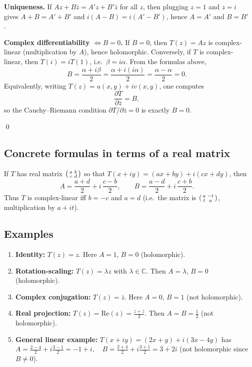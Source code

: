 \documentclass[11pt,a4paper]{article}
\theoremstyle{definition}
\theoremstyle{definition}
\theoremstyle{plain}
\theoremstyle{remark}
\begin{document}
\smallskip
\textbf{Uniqueness.}
If $Az+B\bar z=A'z+B'\bar z$ for all $z$, then plugging $z=1$ and $z=i$ gives
$A+B=A'+B'$ and $i(A-B)=i(A'-B')$, hence $A=A'$ and $B=B'$.

\smallskip
\textbf{Complex differentiability $\iff B=0$.}
If $B=0$, then $T(z)=Az$ is complex-linear (multiplication by $A$), hence holomorphic.
Conversely, if $T$ is complex-linear, then $T(i)=iT(1)$, i.e.\ $\beta=i\alpha$.
From the formulas above,
\[
B=\frac{\alpha+i\beta}{2}=\frac{\alpha+i(i\alpha)}{2}=\frac{\alpha-\alpha}{2}=0.
\]
Equivalently, writing $T(z)=u(x,y)+iv(x,y)$, one computes
\[
\frac{\partial T}{\partial\bar z}=B,
\]
so the Cauchy–Riemann condition $\partial T/\partial\bar z=0$ is exactly $B=0$.

\qed

\subsection*{Concrete formulas in terms of a real matrix}
If $T$ has real matrix $\begin{psmallmatrix}a&b\\ c&d\end{psmallmatrix}$ so that
$T(x+iy)=(ax+by)+i(cx+dy)$, then
\[
A=\frac{a+d}{2}+i\,\frac{c-b}{2},\qquad
B=\frac{a-d}{2}+i\,\frac{c+b}{2}.
\]
Thus $T$ is complex-linear iff $b=-c$ and $a=d$ (i.e.\ the matrix is
$\begin{psmallmatrix}a&-t\\ t&a\end{psmallmatrix}$, multiplication by $a+it$).

\subsection*{Examples}
\begin{enumerate}
	\item \textbf{Identity:} $T(z)=z$. Here $A=1$, $B=0$ (holomorphic).
	\item \textbf{Rotation-scaling:} $T(z)=\lambda z$ with $\lambda\in\mathbb{C}$. Then $A=\lambda$, $B=0$ (holomorphic).
	\item \textbf{Complex conjugation:} $T(z)=\bar z$. Here $A=0$, $B=1$ (not holomorphic).
	\item \textbf{Real projection:} $T(z)=\mathrm{Re}(z)=\frac{z+\bar z}{2}$. Then $A=B=\frac12$ (not holomorphic).
	\item \textbf{General linear example:}
	$T(x+iy)=(2x+y)+i(3x-4y)$ has
	$A=\frac{2-4}{2}+i\frac{3-1}{2}=-1+i,\quad
	B=\frac{2+4}{2}+i\frac{3+1}{2}=3+2i$ (not holomorphic since $B\neq0$).
\end{enumerate}
\end{document}
